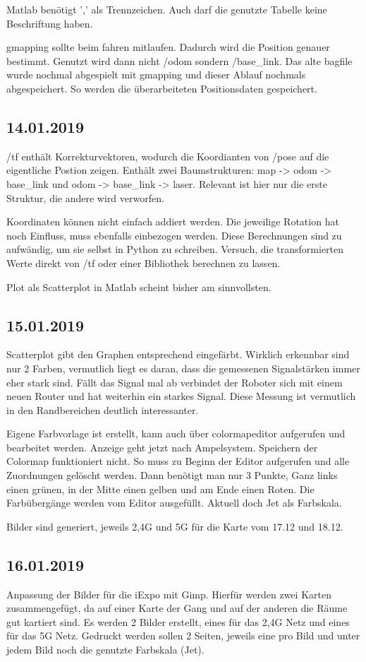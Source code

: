 \documentclass{scrartcl}%
\begin{document}
Matlab benötigt ',' als Trennzeichen. Auch darf die genutzte Tabelle keine Beschriftung haben.

gmapping sollte beim fahren mitlaufen. Dadurch wird die Position genauer bestimmt. Genutzt wird dann nicht /odom sondern /base\_link. Das alte bagfile wurde nochmal abgespielt mit gmapping und dieser Ablauf nochmals abgespeichert. So werden die überarbeiteten Positionsdaten gespeichert.


\subsection{14.01.2019}
/tf enthält Korrekturvektoren, wodurch die Koordianten von /pose auf die eigentliche Postion zeigen. Enthält zwei Baumstrukturen: map -> odom -> base\_link und odom -> base\_link -> laser. Relevant ist hier nur die erste Struktur, die andere wird verworfen.

Koordinaten können nicht einfach addiert werden. Die jeweilige Rotation hat noch Einfluss, muss ebenfalls einbezogen werden. Diese Berechnungen sind zu aufwändig, um sie selbst in Python zu schreiben. Versuch, die transformierten Werte direkt von /tf oder einer Bibliothek berechnen zu lassen.

Plot als Scatterplot in Matlab scheint bisher am sinnvollsten.

\subsection{15.01.2019}
Scatterplot gibt den Graphen entsprechend eingefärbt. Wirklich erkennbar sind nur 2 Farben, vermutlich liegt es daran, dass die gemessenen Signalstärken immer eher stark sind. Fällt das Signal mal ab verbindet der Roboter sich mit einem neuen Router und hat weiterhin ein starkes Signal. Diese Messung ist vermutlich in den Randbereichen deutlich interessanter.

Eigene Farbvorlage ist erstellt, kann auch über colormapeditor aufgerufen und bearbeitet werden. Anzeige geht jetzt nach Ampelsystem. Speichern der Colormap funktioniert nicht. So muss zu Beginn der Editor aufgerufen und alle Zuordnungen gelöscht werden. Dann benötigt man nur 3 Punkte, Ganz links einen grünen, in der Mitte einen gelben und am Ende einen Roten. Die Farbübergänge werden vom Editor ausgefüllt. Aktuell doch Jet als Farbskala.

Bilder sind generiert, jeweils 2,4G und 5G für die Karte vom 17.12 und 18.12.

\subsection{16.01.2019}
Anpassung der Bilder für die iExpo mit Gimp. Hierfür werden zwei Karten zusammengefügt, da auf einer Karte der Gang und auf der anderen die Räume gut kartiert sind. Es werden 2 Bilder erstellt, eines für das 2,4G Netz und eines für das 5G Netz. Gedruckt werden sollen 2 Seiten, jeweils eine pro Bild und unter jedem Bild noch die genutzte Farbskala (Jet).
\end{document}
